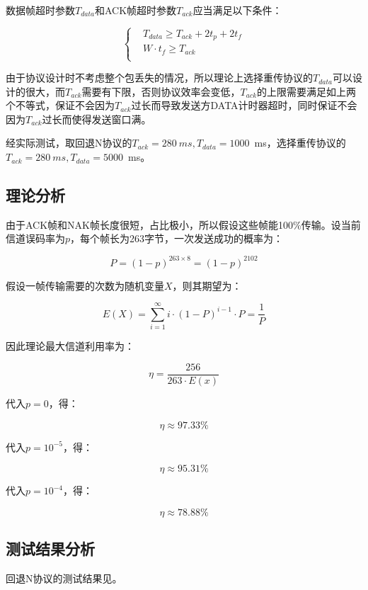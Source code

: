 \documentclass[lang=cn,11pt,a4paper,cite=authornum]{paper}
\begin{document}
数据帧超时参数$T_{data}$和ACK帧超时参数$T_{ack}$应当满足以下条件：

$$
    \left\{
    \begin{aligned}
         & T_{data} \geq T_{ack} + 2t_p + 2t_f \\
         & W\cdot t_f \geq T_{ack}            \\
    \end{aligned}
    \right.
$$

由于协议设计时不考虑整个包丢失的情况，所以理论上选择重传协议的$T_{data}$可以设计的很大，而$T_{ack}$需要有下限，否则协议效率会变低，$T_{ack}$的上限需要满足如上两个不等式，保证不会因为$T_{ack}$过长而导致发送方DATA计时器超时，同时保证不会因为$T_{ack}$过长而使得发送窗口满。

经实际测试，取回退N协议的$T_{ack}=280\ ms,T_{data}=1000$\ ms，选择重传协议的$T_{ack}=280\ ms,T_{data}=5000$\ ms。

\subsection{理论分析}

由于ACK帧和NAK帧长度很短，占比极小，所以假设这些帧能100\%传输。设当前信道误码率为$p$，每个帧长为263字节，一次发送成功的概率为：

$$
    P=(1-p)^{263\times 8} = (1-p)^{2102}
$$

假设一帧传输需要的次数为随机变量$X$，则其期望为：

$$
    E(X) = \sum_{i=1}^{\infty}i\cdot (1-P)^{i-1}\cdot P=\frac 1P
$$

因此理论最大信道利用率为：

$$
    \eta = \frac {256}{263\cdot E(x)}
$$

代入$p=0$，得：

$$\eta \approx 97.33\%$$

代入$p=10^{-5}$，得：

$$\eta \approx 95.31\%$$

代入$p=10^{-4}$，得：

$$\eta \approx 78.88\%$$

\subsection{测试结果分析}

回退N协议的测试结果见。
\end{document}
